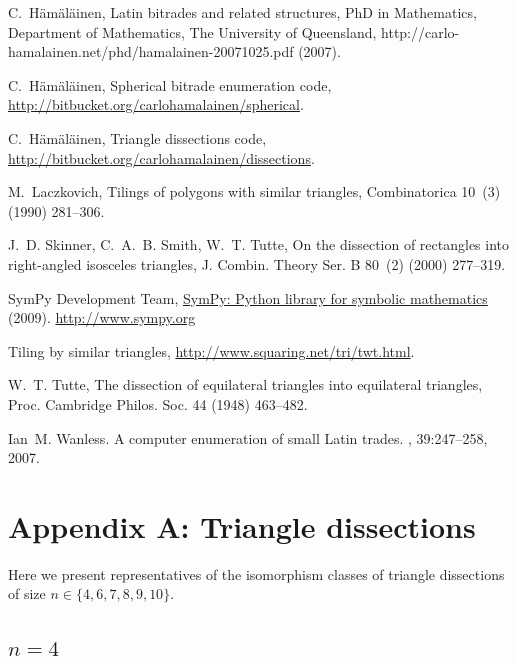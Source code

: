 \documentclass[12pt,amstags,fleqn]{article}
\theoremstyle{plain}
\theoremstyle{definition}
\begin{document}
\begin{thebibliography}{10}
C.~H\"{a}m\"{a}l\"{a}inen, Latin bitrades and related structures, {PhD} in
  {M}athematics, Department of Mathematics, The University of Queensland,
  http://carlo-hamalainen.net/phd/hamalainen-20071025.pdf (2007).

C.~H\"{a}m\"{a}l\"{a}inen, Spherical bitrade enumeration code,
  \url{http://bitbucket.org/carlohamalainen/spherical}.

C.~H\"{a}m\"{a}l\"{a}inen,
Triangle dissections code,
  \url{http://bitbucket.org/carlohamalainen/dissections}.

M.~Laczkovich, Tilings of polygons with similar triangles, Combinatorica 10~(3)
  (1990) 281--306.

J.~D. Skinner, C.~A.~B. Smith, W.~T. Tutte, On the dissection of rectangles
  into right-angled isosceles triangles, J. Combin. Theory Ser. B 80~(2) (2000)
  277--319.

{SymPy Development Team}, \href{http://www.sympy.org}{SymPy: Python library for
  symbolic mathematics} (2009).
\newline\urlprefix\url{http://www.sympy.org}

Tiling by similar triangles, \url{http://www.squaring.net/tri/twt.html}.

W.~T. Tutte, The dissection of equilateral triangles into equilateral
  triangles, Proc. Cambridge Philos. Soc. 44 (1948) 463--482.

Ian~M. Wanless.
\newblock A computer enumeration of small {L}atin trades.
, 39:247--258, 2007.


\end{thebibliography}

\clearpage

\section*{Appendix A: Triangle dissections}

Here we present representatives of the isomorphism classes of triangle
dissections of size $n \in \{4, 6, 7, 8, 9, 10 \}$.

%

\subsection*{$n = 4$}
\end{document}
